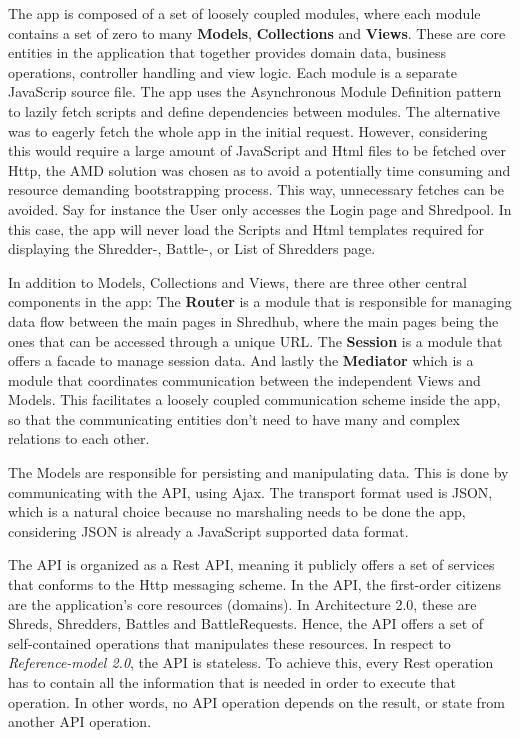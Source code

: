 The app is composed of a set of loosely coupled modules, where each module contains a set of zero to many \textbf{Models}, \textbf{Collections} and \textbf{Views}. These are core entities in the application that together provides domain data, business operations, controller handling and view logic. Each module is a separate JavaScrip source file. The app uses the Asynchronous Module Definition pattern to lazily fetch scripts and define dependencies between modules. The alternative was to eagerly fetch the whole app in the initial request. However, considering this would require a large amount of JavaScript and Html files to be fetched over Http, the AMD solution was chosen as to avoid a potentially time consuming and resource demanding bootstrapping process. This way, unnecessary fetches can be avoided. Say for instance the User only accesses the Login page and Shredpool. In this case, the app will never load the Scripts and Html templates required for displaying the Shredder-, Battle-, or List of Shredders page. 

In addition to Models, Collections and Views, there are three other central components in the app: The \textbf{Router} is a module that is responsible for managing data flow between the main pages in Shredhub, where the main pages being the ones that can be accessed through a unique URL. The \textbf{Session} is a  module that offers a facade to manage session data. And lastly the \textbf{Mediator} which is a module that coordinates communication between the independent Views and Models. This facilitates a loosely coupled communication scheme inside the app, so that the communicating entities don't need to have many and complex relations to each other. 

The Models are responsible for persisting and manipulating data. This is done by communicating with the API, using Ajax. The transport format used is JSON, which is a natural choice because no marshaling needs to be done the app, considering JSON is already a JavaScript supported data format. 

The API is organized as a Rest API, meaning it publicly offers a set of services that conforms to the Http messaging scheme. In the API, the first-order citizens are the application's core resources (domains). In Architecture 2.0, these are Shreds, Shredders, Battles and BattleRequests. Hence, the API offers a set of self-contained operations that manipulates these resources. In respect to \textit{Reference-model 2.0}, the API is stateless. To achieve this, every Rest operation has to contain all the information that is needed in order to execute that operation. In other words, no API operation depends on the result, or state from another API operation. 

